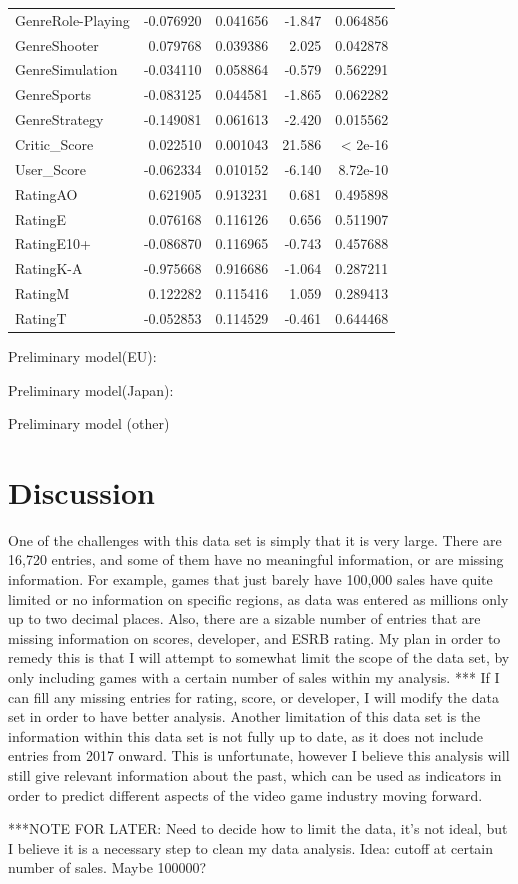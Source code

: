 \documentclass[12pt]{article}
\begin{document}
\begin{table}[ht]
\begin{tabular}{lrrrr}
$$GenreRole-Playing & -0.076920 & 0.041656 & -1.847 & 0.064856 \\
GenreShooter & 0.079768 & 0.039386 & 2.025 & 0.042878 \\
GenreSimulation & -0.034110 & 0.058864 & -0.579 & 0.562291 \\
GenreSports & -0.083125 & 0.044581 & -1.865 & 0.062282 \\
GenreStrategy & -0.149081 & 0.061613 & -2.420 & 0.015562 \\
Critic_Score & 0.022510 & 0.001043 & 21.586 & < 2e-16 \\
User_Score & -0.062334 & 0.010152 & -6.140 & 8.72e-10 \\
RatingAO & 0.621905 & 0.913231 & 0.681 & 0.495898 \\
RatingE & 0.076168 & 0.116126 & 0.656 & 0.511907 \\
RatingE10+ & -0.086870 & 0.116965 & -0.743 & 0.457688 \\
RatingK-A & -0.975668 & 0.916686 & -1.064 & 0.287211 \\
RatingM & 0.122282 & 0.115416 & 1.059 & 0.289413 \\
RatingT & -0.052853 & 0.114529 & -0.461 & 0.644468 \\
 \hline
\end{tabular}
\end{table}

Preliminary model(EU):


Preliminary model(Japan):


Preliminary model (other)

\section{Discussion}
\label{sec:disc}

One of the challenges with this data set is simply that it is very large. There are 16,720 entries, and some of them have no meaningful 
information, or are missing information. For example, games that just barely have 100,000 sales have quite limited or no information on 
specific regions, as data was entered as millions only up to two decimal places. Also, there are a sizable number of entries that are 
missing information on scores, developer, and ESRB rating. My plan in order to remedy this is that I will attempt to somewhat limit the 
scope of the data set, by only including games with a certain number of sales within my analysis. ***
If I can fill any missing entries for rating, score, or developer, I will modify the data set in order to have better analysis. Another 
limitation of this data set is the information within this data set is not fully up to date, as it does not include entries from 2017 
onward. This is unfortunate, however I believe this analysis will still give relevant information about the past, which can be used as 
indicators in order to predict different aspects of the video game industry moving forward.

***NOTE FOR LATER: Need to decide how to limit the data, it's not ideal, but I believe it is a necessary step to clean my data analysis. Idea: cutoff at certain number of sales. Maybe 100000?


\end{document}

